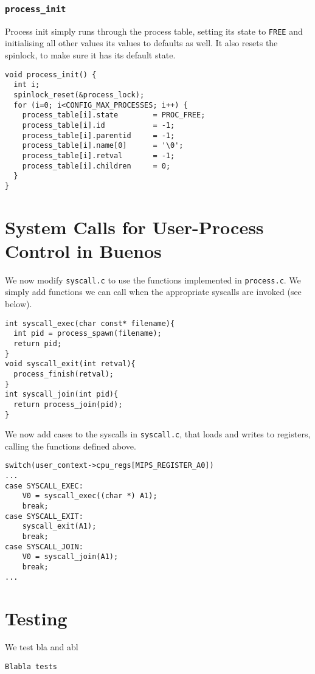 \documentclass[a4paper,12pt]{article}
\begin{document}
\subsubsection{\texttt{process\_init}}
Process init simply runs through the process table, setting its state to \texttt{FREE} and initialising all other values its values to defaults as well. It also resets the spinlock, to make sure it has its default state.
\begin{lstlisting}
void process_init() {
  int i;
  spinlock_reset(&process_lock);
  for (i=0; i<CONFIG_MAX_PROCESSES; i++) {
    process_table[i].state        = PROC_FREE;
    process_table[i].id           = -1;
    process_table[i].parentid     = -1;
    process_table[i].name[0]      = '\0'; 
    process_table[i].retval       = -1;
    process_table[i].children     = 0;
  }
}
\end{lstlisting}

\section{System Calls for User-Process Control in Buenos}
We now modify \texttt{syscall.c} to use the functions implemented in \texttt{process.c}. We simply add functions we can call when the appropriate syscalls are invoked (see below).
\begin{lstlisting}
int syscall_exec(char const* filename){
  int pid = process_spawn(filename);
  return pid;
}
void syscall_exit(int retval){
  process_finish(retval);
}
int syscall_join(int pid){
  return process_join(pid);
}
\end{lstlisting}

We now add cases to the syscalls in \texttt{syscall.c}, that loads and writes to registers, calling the functions defined above.
\begin{lstlisting}
switch(user_context->cpu_regs[MIPS_REGISTER_A0])
...
case SYSCALL_EXEC:
    V0 = syscall_exec((char *) A1);
    break;
case SYSCALL_EXIT:
    syscall_exit(A1);
    break;
case SYSCALL_JOIN:
    V0 = syscall_join(A1);
    break;
...
\end{lstlisting}

\section{Testing}
We test bla and abl
\begin{lstlisting}
Blabla tests
\end{lstlisting}
\end{document}
